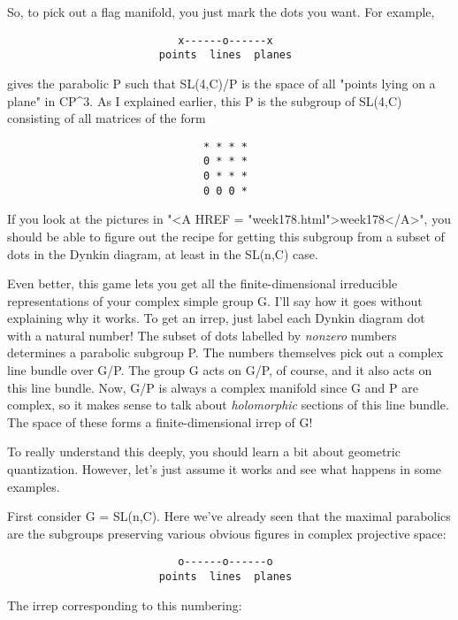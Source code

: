 So, to pick out a flag manifold, you just mark the dots you want.  
For example, 

\begin{verbatim}
                           x------o------x
                        points  lines  planes       
\end{verbatim}
    
gives the parabolic P such that SL(4,C)/P is the space of all "points
lying on a plane" in CP^{3}.  As I explained earlier, 
this P is the 
subgroup of SL(4,C) consisting of all matrices of the form

\begin{verbatim}
                               * * * *
                               0 * * *          
                               0 * * *
                               0 0 0 *
\end{verbatim}
    
If you look at the pictures in "<A HREF = "week178.html">week178</A>", you should be able to figure
out the recipe for getting this subgroup from a subset of dots in the 
Dynkin diagram, at least in the SL(n,C) case.

Even better, this game lets you get all the finite-dimensional irreducible 
representations of your complex simple group G.  I'll say how it goes
without explaining why it works.  To get an irrep, just label each
Dynkin diagram dot with a natural number!  The subset of dots labelled
by \emph{nonzero} numbers determines a parabolic subgroup P.  The numbers
themselves pick out a complex line bundle over G/P.  The group G acts
on G/P, of course, and it also acts on this line bundle.  Now, G/P is 
always a complex manifold since G and P are complex, so it makes sense
to talk about \emph{holomorphic} sections of this line bundle.  The space
of these forms a finite-dimensional irrep of G!  

To really understand this deeply, you should learn a bit about geometric
quantization.  However, let's just assume it works and see what happens
in some examples.  

First consider G = SL(n,C).  Here we've already seen that the maximal 
parabolics are the subgroups preserving various obvious figures in 
complex projective space:

\begin{verbatim}
                           o------o------o
                        points  lines  planes       
\end{verbatim}
    
The irrep corresponding to this numbering:

